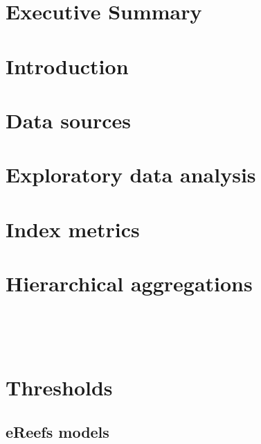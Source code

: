 \documentclass[a4paper]{AIMSreport}
\begin{document}
    
\newcommand{\res}{_small}

\section{Executive Summary}

\section{Introduction}

\section{Data sources}



\section{Exploratory data analysis}


 

\section{Index metrics}


 

\section{Hierarchical aggregations}




~\\[2em]



~\\[2em]
\setcounter{table}{0}
\setcounter{figure}{0}
\renewcommand{\thetable}{\Alph{section}\arabic{table}}
\renewcommand{\thefigure}{\Alph{section}\arabic{figure}}
 
   
\section{Thresholds} 

\clearpage



\clearpage

\begin{landscape}       
\section{eReefs models}
 

\end{landscape}  
 
\clearpage 
\end{document}
